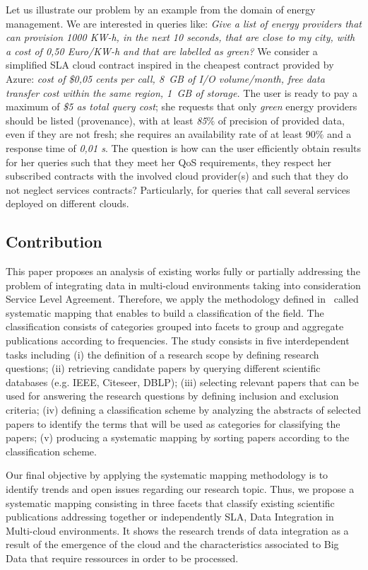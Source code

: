 Let us illustrate our problem by an example from the domain of energy management.
We are interested in queries like: \textit{Give a list of energy providers that can provision 1000 KW-h, in the next 10 seconds, that are close to my city, with a cost of 0,50 Euro/KW-h and that are labelled as green?}
We consider a simplified SLA cloud contract inspired in the cheapest contract provided by Azure: \textit{cost of \$0,05 cents per call,  8~GB of I/O volume/month, free data transfer cost within the same region,  1~GB of storage.} 
The user is ready to pay a maximum of \textit{\$5 as total query cost}; she requests that only  \textit{green} energy providers should be  listed (provenance), with at least  \textit{85$\%$} of precision of provided data, even if they are not fresh; she requires an availability rate of at least 90$\%$ and a response time of  \textit{0,01 s}. 
  The question is how can the user efficiently obtain  results for her queries such that they meet her QoS requirements, they respect her subscribed contracts with the involved cloud provider(s) and such that they do not neglect services contracts? Particularly, for queries that call several services deployed  on different clouds.

\subsection{Contribution}
This paper proposes an analysis of existing works fully or partially addressing the problem of integrating data in multi-cloud environments taking into consideration Service Level Agreement. Therefore, we apply the  methodology defined in~\cite{SM:Petersen:2008} called  systematic mapping  that enables to build a classification of the field. The classification consists of categories grouped into facets  to group and aggregate  publications according to frequencies. The study consists in  five interdependent tasks including (i) the definition of a research scope by defining research questions; (ii) retrieving candidate papers by querying different scientific databases (e.g. IEEE, Citeseer, DBLP); (iii) selecting relevant papers that can be used for answering the research questions by defining inclusion and exclusion criteria; (iv) defining a classification scheme by  analyzing the abstracts of selected papers to identify the terms that will be used as categories for classifying the papers; (v) producing a systematic mapping by sorting papers according to the classification scheme. 

Our final objective by applying the systematic mapping methodology is to identify trends and open issues regarding our research topic. Thus, we propose a systematic mapping consisting in three facets that classify existing scientific publications addressing  together or independently SLA, Data Integration in Multi-cloud environments. It shows the research trends of data integration as a result of the emergence of the cloud and the characteristics associated to Big Data that require ressources in order to be processed.


